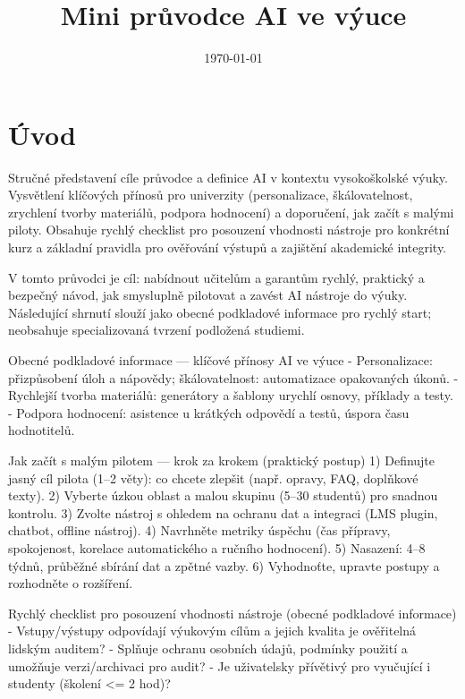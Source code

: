 \documentclass{report}%
\title{Mini průvodce AI ve výuce}%
\date{\today}%
\begin{document}
%
\normalsize%
%
\hypersetup{pageanchor=false}%
%
\maketitle%
\tableofcontents%
\clearpage%
\hypersetup{pageanchor=true}%
%
\chapter{Úvod}%
Stručné představení cíle průvodce a definice AI v kontextu vysokoškolské výuky. Vysvětlení klíčových přínosů pro univerzity (personalizace, škálovatelnost, zrychlení tvorby materiálů, podpora hodnocení) a doporučení, jak začít s malými piloty. Obsahuje rychlý checklist pro posouzení vhodnosti nástroje pro konkrétní kurz a základní pravidla pro ověřování výstupů a zajištění akademické integrity.%


%
V tomto průvodci je cíl: nabídnout učitelům a garantům rychlý, praktický a bezpečný návod, jak smysluplně pilotovat a zavést AI nástroje do výuky.
Následující shrnutí slouží jako obecné podkladové informace pro rychlý start; neobsahuje specializovaná tvrzení podložená studiemi.

Obecné podkladové informace — klíčové přínosy AI ve výuce
- Personalizace: přizpůsobení úloh a nápovědy; škálovatelnost: automatizace opakovaných úkonů.
- Rychlejší tvorba materiálů: generátory a šablony urychlí osnovy, příklady a testy.
- Podpora hodnocení: asistence u krátkých odpovědí a testů, úspora času hodnotitelů.

Jak začít s malým pilotem — krok za krokem (praktický postup)
1) Definujte jasný cíl pilota (1–2 věty): co chcete zlepšit (např. opravy, FAQ, doplňkové texty).
2) Vyberte úzkou oblast a malou skupinu (5–30 studentů) pro snadnou kontrolu.
3) Zvolte nástroj s ohledem na ochranu dat a integraci (LMS plugin, chatbot, offline nástroj).
4) Navrhněte metriky úspěchu (čas přípravy, spokojenost, korelace automatického a ručního hodnocení).
5) Nasazení: 4–8 týdnů, průběžné sbírání dat a zpětné vazby.
6) Vyhodnoťte, upravte postupy a rozhodněte o rozšíření.

Rychlý checklist pro posouzení vhodnosti nástroje (obecné podkladové informace)
- Vstupy/výstupy odpovídají výukovým cílům a jejich kvalita je ověřitelná lidským auditem?
- Splňuje ochranu osobních údajů, podmínky použití a umožňuje verzi/archivaci pro audit?
- Je uživatelsky přívětivý pro vyučující i studenty (školení <= 2 hod)?
\end{document}
